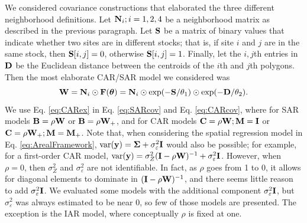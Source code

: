 \documentclass[11pt, titlepage]{article}\usepackage[]{graphicx}\usepackage[]{color}
\begin{document}
\begin{spacing}{1.9}
\begin{flushleft}
We considered covariance constructions that elaborated the three different neighborhood definitions.  Let $\mathbf{N}_i; i = 1,2,4$ be a neighborhood matrix as described in the previous paragraph.  Let $\mathbf{S}$ be a matrix of binary values that indicate whether two sites are in different stocks; that is, if site $i$ and $j$ are in the same stock, then $\mathbf{S}[i,j] = 0$, otherwise $\mathbf{S}[i,j] = 1$.  Finally, let the $i,j$th entries in $\mathbf{D}$ be the Euclidean distance between the centroids of the $i$th and $j$th polygons.  Then the most elaborate CAR/SAR model we considered was
\begin{equation} \label{eq:CARex}
	\mathbf{W} = \mathbf{N}_i \odot \mathbf{F}(\mbox{\boldmath $\theta$}) = \mathbf{N}_i \odot \exp(-\mathbf{S}/\theta_1) \odot \exp(-\mathbf{D}/\theta_2).
\end{equation}
We use Eq. \ref{eq:CARex} in Eq. \ref{eq:SARcov} and Eq. \ref{eq:CARcov}, where for SAR models $\mathbf{B} = \rho\mathbf{W}$ or $\mathbf{B} = \rho\mathbf{W}_+$, and for CAR models $\mathbf{C} = \rho\mathbf{W}; \mathbf{M} = \mathbf{I}$ or $\mathbf{C} = \rho\mathbf{W}_+; \mathbf{M} = \mathbf{M}_+$. Note that, when considering the spatial regression model in Eq. \ref{eq:ArealFramework}, $\textrm{var}(\mathbf{y}) = \mbox{\boldmath $\Sigma$} + \sigma^2_\varepsilon\mathbf{I}$ would also be possible; for example, for a first-order CAR model, $\textrm{var}(\mathbf{y}) = \sigma_Z^2(\mathbf{I} - \rho\mathbf{W})^{-1} + \sigma^2_\varepsilon\mathbf{I}$.  However, when $\rho=0$, then $\sigma_Z^2$ and $\sigma^2_\varepsilon$ are not identifiable. In fact, as $\rho$ goes from 1 to 0, it allows for diagonal elements to dominate in $(\mathbf{I} - \rho\mathbf{W})^{-1}$, and there seems little reason to add $\sigma^2_\varepsilon\mathbf{I}$.  We evaluated some models with the additional component $\sigma^2_\varepsilon\mathbf{I}$, but $\sigma^2_\varepsilon$ was always estimated to be near 0, so few of those models are presented.  The exception is the IAR model, where conceptually $\rho$ is fixed at one.


\end{flushleft}
\end{spacing}
\end{document}
